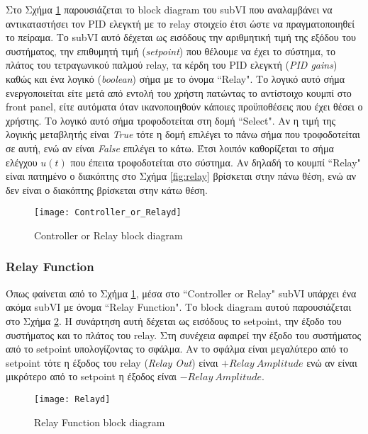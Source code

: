 Στο Σχήμα \ref{fig:Controller_or_Relayd} παρουσιάζεται το block diagram του subVI που αναλαμβάνει να αντικαταστήσει τον PID ελεγκτή με το relay στοιχείο έτσι ώστε να πραγματοποιηθεί το πείραμα. Το subVI αυτό δέχεται ως εισόδους την αριθμητική τιμή της εξόδου του συστήματος, την επιθυμητή τιμή (\emph{setpoint}) που θέλουμε να έχει το σύστημα, το πλάτος του τετραγωνικού παλμού relay, τα κέρδη του PID ελεγκτή (\emph{PID gains}) καθώς και ένα λογικό (\emph{boolean}) σήμα με το όνομα ``Relay". Το λογικό αυτό σήμα ενεργοποιείται είτε μετά από εντολή του χρήστη πατώντας το αντίστοιχο κουμπί στο front panel, είτε αυτόματα όταν ικανοποιηθούν κάποιες προϋποθέσεις που έχει θέσει ο χρήστης. Το λογικό αυτό σήμα τροφοδοτείται στη δομή ``Select". Αν η τιμή της λογικής μεταβλητής είναι \textit{True} τότε η δομή επιλέγει το πάνω σήμα που τροφοδοτείται σε αυτή, ενώ αν είναι \textit{False} επιλέγει το κάτω. Έτσι λοιπόν καθορίζεται το σήμα ελέγχου $u(t)$ που έπειτα τροφοδοτείται στο σύστημα. Αν δηλαδή το κουμπί ``Relay" είναι πατημένο ο διακόπτης στο Σχήμα \ref{fig:relay} βρίσκεται στην πάνω θέση, ενώ αν δεν είναι ο διακόπτης βρίσκεται στην κάτω θέση.

\begin{figure}[h]
  \centering
  \texttt{[image: Controller\_or\_Relayd]}
  \caption{Controller or Relay block diagram}
  \label{fig:Controller_or_Relayd}
\end{figure}

\subsubsection{Relay Function}

Όπως φαίνεται από το Σχήμα \ref{fig:Controller_or_Relayd}, μέσα στο ``Controller or Relay" subVI υπάρχει ένα ακόμα subVI με όνομα ``Relay Function". Το block diagram αυτού παρουσιάζεται στο Σχήμα \ref{fig:Relayd}. Η συνάρτηση αυτή δέχεται ως εισόδους το setpoint, την έξοδο του συστήματος και το πλάτος του relay. Στη συνέχεια αφαιρεί την έξοδο του συστήματος από το setpoint υπολογίζοντας το σφάλμα. Αν το σφάλμα είναι μεγαλύτερο από το setpoint τότε η έξοδος του relay (\emph{Relay Out}) είναι $+Relay \ Amplitude$ ενώ αν είναι μικρότερο από το setpoint η έξοδος είναι $-Relay \ Amplitude$.

\begin{figure}[H]
  \centering
  \texttt{[image: Relayd]}
  \caption{Relay Function block diagram}
  \label{fig:Relayd}
\end{figure}

